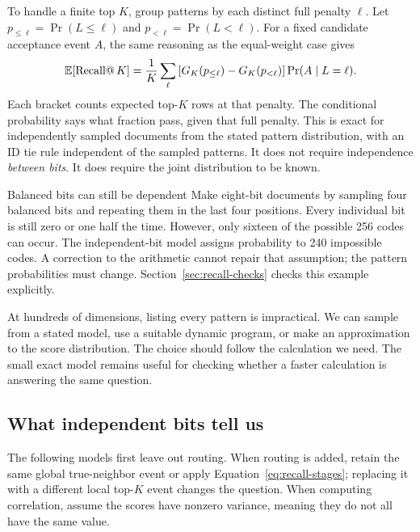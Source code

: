 To handle a finite top $K$, group patterns by each distinct full penalty $\ell$. Let
$p_{\le\ell}=\Pr(L\le\ell)$ and $p_{<\ell}=\Pr(L<\ell)$. For a fixed candidate acceptance event
$A$, the same reasoning as the equal-weight case gives
\begin{equation}
\mathbb E[\operatorname{Recall@}K]
=\frac1K\sum_{\ell}
 \left[G_K(p_{\le\ell})-G_K(p_{<\ell})\right]\Pr(A\mid L=\ell).
\label{eq:weighted-finite-recall}
\end{equation}
Each bracket counts expected top-$K$ rows at that penalty. The conditional probability says
what fraction pass, given that full penalty. This is exact for independently sampled documents from the stated pattern
distribution, with an ID tie rule independent of the sampled patterns. It does not require
independence \emph{between bits}. It does require the joint distribution to be known.

\begin{examplebox}{Balanced bits can still be dependent}
Make eight-bit documents by sampling four balanced bits and repeating them in the last four
positions. Every individual bit is still zero or one half the time. However, only sixteen
of the possible 256 codes can occur. The independent-bit model assigns probability to 240
impossible codes. A correction to the arithmetic cannot repair that assumption; the pattern
probabilities must change. Section~\ref{sec:recall-checks} checks this example explicitly.
\end{examplebox}

At hundreds of dimensions, listing every pattern is impractical. We can sample from a stated
model, use a suitable dynamic program, or make an approximation to the score distribution.
The choice should follow the calculation we need. The small exact model remains useful for
checking whether a faster calculation is answering the same question.

\subsection{What independent bits tell us}
The following models first leave out routing. When routing is added, retain the same global true-neighbor event or apply Equation~\eqref{eq:recall-stages}; replacing it with a different local top-$K$ event changes the question. When computing correlation, assume the scores have nonzero variance, meaning they do not all have the same value.

